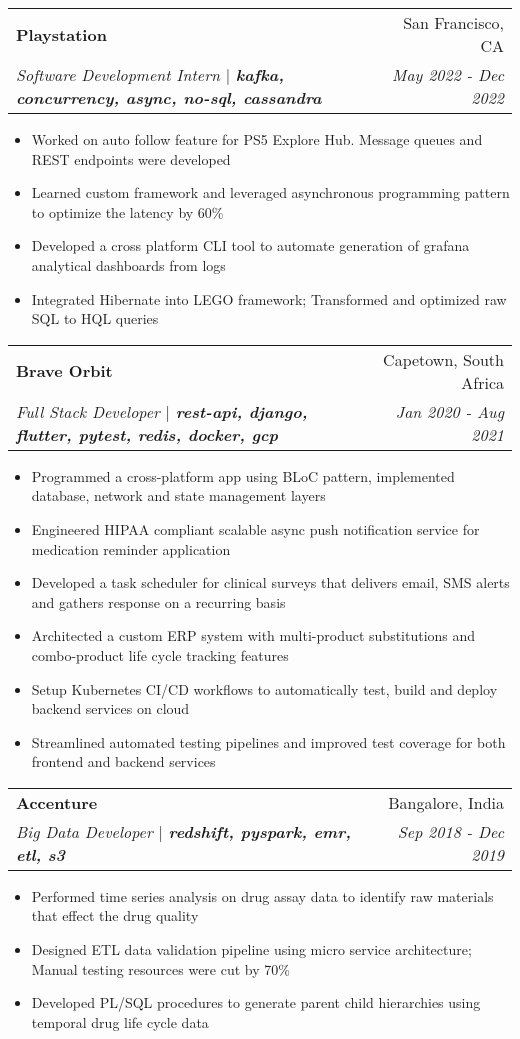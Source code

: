 \documentclass[a4paper,20pt]{article}
\makeatletter
\newcommand{\resumeItemClean}[1]{
    \item\small{
        {#1 \vspace{-2pt}}
    }
}
\newcommand{\resumeSubheading}[4]{
  \vspace{-1pt}\item
    \begin{tabular*}{0.97\textwidth}{l@{\extracolsep{\fill}}r}
      \textbf{#1} & #2 \\
      \textit{#3} & \textit{#4} \\
    \end{tabular*}\vspace{-5pt}
}
\newcommand{\resumeItemListStart}{\begin{itemize}}
\newcommand{\resumeItemListEnd}{\end{itemize}\vspace{-5pt}}
\makeatother
\begin{document}
  \resumeSubheading{Playstation}{San Francisco, CA}
    {Software Development Intern  \(|\) \textbf{kafka, concurrency, async, no-sql, cassandra}}{May 2022 - Dec 2022}
    \resumeItemListStart
        \resumeItemClean
        {Worked on auto follow feature for PS5 Explore Hub. Message queues and REST endpoints were developed}
        \resumeItemClean
          {Learned custom framework and leveraged asynchronous programming pattern to optimize the latency by 60\%}
        \resumeItemClean
          {Developed a cross platform CLI tool to automate generation of grafana analytical dashboards from logs}
	\resumeItemClean
	{Integrated Hibernate into LEGO framework; Transformed and optimized raw SQL to HQL queries}
        \resumeItemListEnd
        
    \resumeSubheading{Brave Orbit}{Capetown, South Africa}
    {Full Stack Developer \(|\) \textbf{rest-api, django, flutter, pytest, redis, docker, gcp}}{Jan 2020 - Aug 2021}
    \resumeItemListStart
        \resumeItemClean
            {Programmed a cross-platform app using BLoC pattern, implemented database, network and state management layers}
          \resumeItemClean
            {Engineered HIPAA compliant scalable async push notification service for medication reminder application}
          \resumeItemClean
            {Developed a task scheduler for clinical surveys that delivers email, SMS alerts and gathers response on a recurring basis}
          \resumeItemClean
            {Architected a custom ERP system with multi-product substitutions and combo-product life cycle tracking features}
          \resumeItemClean
            {Setup Kubernetes CI/CD workflows to automatically test, build and deploy backend services on cloud}
          \resumeItemClean
            {Streamlined automated testing pipelines and improved test coverage for both frontend and backend services}
    \resumeItemListEnd
      
    \resumeSubheading{Accenture}{Bangalore, India}
    {Big Data Developer \(|\) \textbf{redshift, pyspark, emr, etl, s3}}{Sep 2018 - Dec 2019}
    \resumeItemListStart
        \resumeItemClean
          {Performed time series analysis on drug assay data to identify raw materials that effect the drug quality}
        \resumeItemClean
          {Designed ETL data validation pipeline using micro service architecture; Manual testing resources were cut by 70\%}
        \resumeItemClean
          {Developed PL/SQL procedures to generate parent child hierarchies using temporal drug life cycle data}
        \resumeItemListEnd
\end{document}
